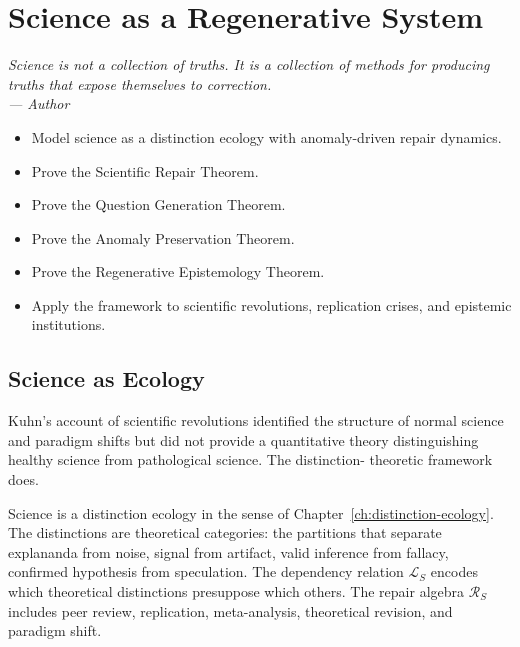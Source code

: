\documentclass[12pt,twoside,openright]{book}
\newenvironment{epigraph}[2]{%
  \vspace{1em}\begin{flushright}
  \begin{minipage}{0.72\textwidth}
  \itshape\small #1\\[0.4em]
  \upshape\footnotesize\sffamily\color{DistGray}--- #2
  \end{minipage}\end{flushright}\vspace{1.5em}}{}
\newenvironment{objectives}{%
  \begin{tcolorbox}[colback=DistBlue!5,colframe=DistBlue,
    title={\faCheckCircle\enspace Learning Objectives},
    fonttitle=\sffamily\bfseries\color{white},
    attach boxed title to top left={yshift=-2mm,xshift=4mm},
    boxed title style={colback=DistBlue},breakable]
  \begin{itemize}[leftmargin=*,nosep]}{%
  \end{itemize}\end{tcolorbox}\vspace{1em}}
\begin{document}
\chapter{Science as a Regenerative System}
\label{ch:science-regen}

\begin{epigraph}{%
  Science is not a collection of truths.
  It is a collection of methods for producing truths
  that expose themselves to correction.}%
  {Author}
\end{epigraph}

\begin{objectives}
  \item Model science as a distinction ecology with
        anomaly-driven repair dynamics.
  \item Prove the Scientific Repair Theorem.
  \item Prove the Question Generation Theorem.
  \item Prove the Anomaly Preservation Theorem.
  \item Prove the Regenerative Epistemology Theorem.
  \item Apply the framework to scientific revolutions,
        replication crises, and epistemic institutions.
\end{objectives}

\section{Science as Ecology}

Kuhn's account of scientific revolutions
\parencite{kuhn1962structure} identified the structure
of normal science and paradigm shifts but did not
provide a quantitative theory distinguishing healthy
science from pathological science. The distinction-
theoretic framework does.

Science is a distinction ecology in the sense of
Chapter~\ref{ch:distinction-ecology}. The distinctions
are theoretical categories: the partitions that
separate explananda from noise, signal from artifact,
valid inference from fallacy, confirmed hypothesis
from speculation. The dependency relation
$\mathcal{L}_S$ encodes which theoretical distinctions
presuppose which others. The repair algebra
$\mathcal{R}_S$ includes peer review, replication,
meta-analysis, theoretical revision, and paradigm shift.
\end{document}

